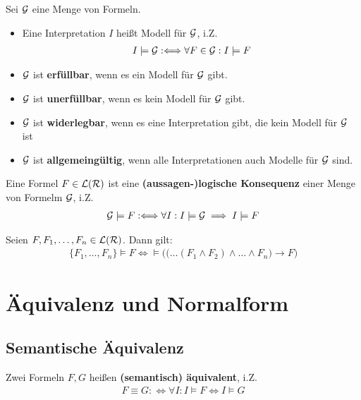 \begin{definition}\label{def3.15}
	Sei $\mathcal{G}$ eine Menge von Formeln.
	\begin{itemize}
		\item Eine Interpretation $I$ heißt Modell für $\mathcal{G}$, i.Z.
		\begin{align*}
			I\models \mathcal{G}:\Longleftrightarrow\forall F\in\mathcal{G}:I\models F
		\end{align*}
		\item $\mathcal{G}$ ist \textbf{erfüllbar}, wenn es ein Modell für $\mathcal{G}$ gibt.
		\item $\mathcal{G}$ ist \textbf{unerfüllbar}, wenn es kein Modell für $\mathcal{G}$ gibt.
		\item $\mathcal{G}$ ist \textbf{widerlegbar}, wenn es eine Interpretation gibt, die kein Modell für $\mathcal{G}$ ist
		\item $\mathcal{G}$ ist \textbf{allgemeingültig}, wenn alle Interpretationen auch Modelle für $\mathcal{G}$ sind.
	\end{itemize}
\end{definition}

\begin{definition}\label{def3.16}
	Eine Formel $F\in\mathcal{L}(\mathcal{R})$ ist eine \textbf{(aussagen-)logische Konsequenz} einer Menge von Formelm $\mathcal{G}$, i.Z.
	\begin{align*}
		\mathcal{G}\models F:\Longleftrightarrow\forall I:I\models\mathcal{G}\implies I\models F
	\end{align*}
\end{definition}

\begin{satz}\label{satz3.17}
	Seien $F,F_1,\ldots,F_n\in\mathcal{L}(\mathcal{R})$. Dann gilt:
	\begin{align*}
		\big\lbrace F_1,\ldots,F_n\big\rbrace\models F\Longleftrightarrow\models\Big(\big(\ldots(F_1\wedge F_2)\wedge\ldots\wedge F_n\big)\to F\Big)
	\end{align*}
\end{satz}

\section{Äquivalenz und Normalform}
\subsection{Semantische Äquivalenz}

\begin{definition}\label{def3.18}
	Zwei Formeln $F,G$ heißen \textbf{(semantisch) äquivalent}, i.Z.
	\begin{align*}
		F\equiv G:\Longleftrightarrow\forall I:I\models F\Longleftrightarrow I\models G
	\end{align*}
\end{definition}

